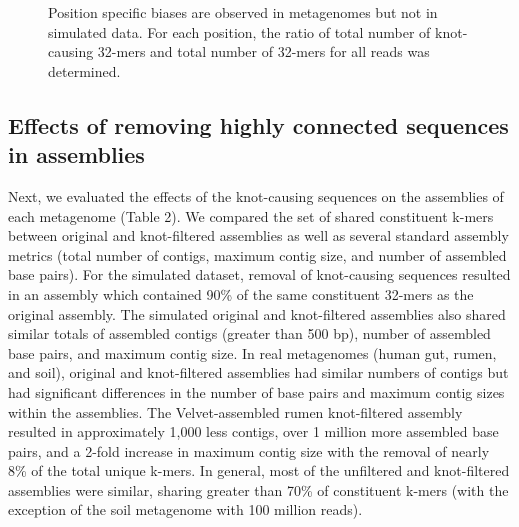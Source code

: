\documentclass[11pt]{article} %
\begin{document}
\begin{figure}
\caption{Position specific biases are observed in metagenomes but not in simulated data.  For each position, the ratio of total number of knot-causing 32-mers and total number of 32-mers for all reads was determined.}
\end{figure}

\subsection{Effects of removing highly connected sequences in assemblies }

Next, we evaluated the effects of the knot-causing sequences on the assemblies of each metagenome (Table 2).   We compared the set of shared constituent k-mers between original and knot-filtered assemblies as well as several standard assembly metrics (total number of contigs, maximum contig size, and number of assembled base pairs). For the simulated dataset, removal of knot-causing sequences resulted in an assembly which contained 90\% of the same constituent 32-mers as the original assembly.  The simulated original and knot-filtered assemblies also shared similar totals of assembled contigs (greater than 500 bp), number of assembled base pairs, and maximum contig size. In real metagenomes (human gut, rumen, and soil), original and knot-filtered assemblies had similar numbers of contigs but had significant differences in the number of base pairs and maximum contig sizes within the assemblies.  The Velvet-assembled rumen knot-filtered assembly resulted in approximately 1,000 less contigs, over 1 million more assembled base pairs, and a 2-fold increase in maximum contig size with the removal of nearly 8\% of the total unique k-mers.  In general, most of the unfiltered and knot-filtered assemblies were similar, sharing greater than 70\% of constituent k-mers (with the exception of the soil metagenome with 100 million reads).    
\end{document}

